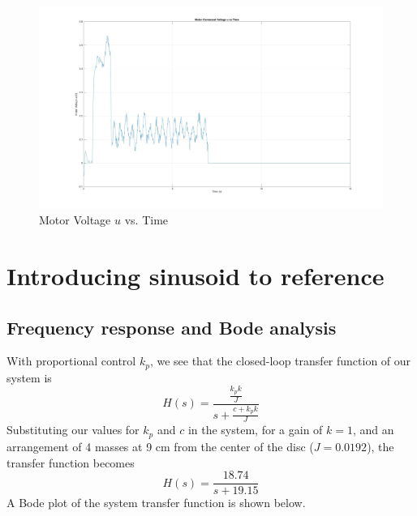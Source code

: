 \documentclass[11pt,titlepage]{article}
\begin{document}
	\begin{figure}[h!]
		\centering
		\includegraphics[trim={6cm 0 0 0},clip,angle=0,origin=c,scale=0.2]{u_vs_time}
		\caption{Motor Voltage $u$ vs. Time}
		\label{fig:u_vs_time}
	\end{figure}
	
\section{Introducing sinusoid to reference}
	\subsection{Frequency response and Bode analysis}
	
	With proportional control $k_p$, we see that the closed-loop transfer function of our system is 
	\begin{equation}
		H(s)=\frac{\frac{k_pk}{J}}{s+\frac{c+k_pk}{J}}
	\end{equation}
	Substituting our values for $k_p$ and $c$ in the system, for a gain of $k=1$, and an arrangement of 4 masses at 9 cm from the center of the disc ($J = 0.0192$), the transfer function becomes 
	\begin{equation}
		H(s)=\frac{18.74}{s + 19.15}
	\end{equation}
	A Bode plot of the system transfer function is shown below. 
\end{document}
